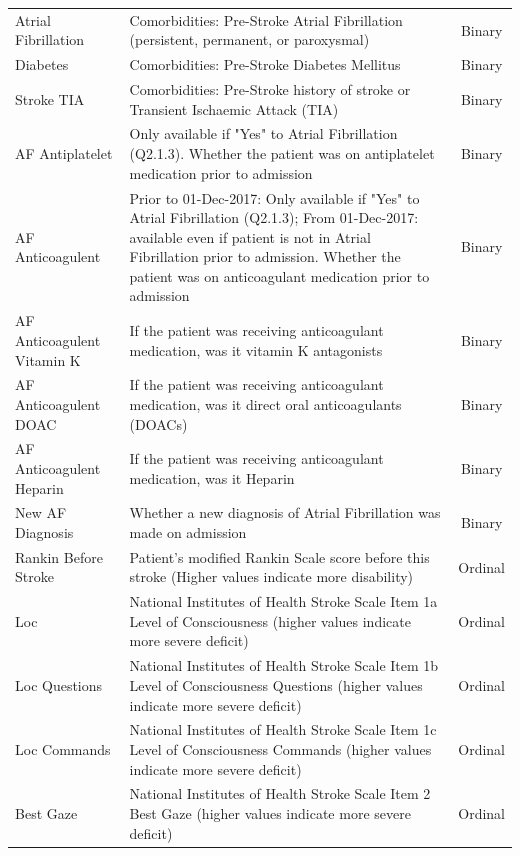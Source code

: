 \documentclass[12pt,a4paper, pdftex]{elsarticle}
\begin{document}
\begin{longtable}{|l|p{8.5cm}|c|}
        Atrial Fibrillation & Comorbidities: Pre-Stroke Atrial Fibrillation (persistent, permanent, or paroxysmal) & Binary \\
        Diabetes & Comorbidities: Pre-Stroke Diabetes Mellitus & Binary \\
        Stroke TIA & Comorbidities: Pre-Stroke history of stroke or Transient Ischaemic Attack (TIA) & Binary \\
        AF Antiplatelet & Only available if "Yes" to Atrial Fibrillation (Q2.1.3). Whether the patient was on antiplatelet medication prior to admission                              & Binary \\
        AF Anticoagulent & Prior to 01-Dec-2017: Only available if "Yes" to Atrial Fibrillation (Q2.1.3); From 01-Dec-2017: available even if patient is not in Atrial Fibrillation prior to admission. Whether the patient was on anticoagulant medication prior to admission & Binary \\
        AF Anticoagulent Vitamin K & If the patient was receiving anticoagulant medication, was it vitamin K antagonists & Binary \\
        AF Anticoagulent DOAC & If the patient was receiving anticoagulant medication, was it direct oral anticoagulants (DOACs) & Binary \\
        AF Anticoagulent Heparin & If the patient was receiving anticoagulant medication, was it Heparin & Binary \\
        New AF Diagnosis & Whether a new diagnosis of Atrial Fibrillation was made on admission & Binary \\
        Rankin Before Stroke & Patient's modified Rankin Scale score before this stroke (Higher values indicate more disability) & Ordinal \\
        Loc & National Institutes of Health Stroke Scale Item 1a Level of Consciousness (higher values indicate more severe deficit) & Ordinal \\
        Loc Questions & National Institutes of Health Stroke Scale Item 1b Level of Consciousness Questions (higher values indicate more severe deficit) & Ordinal \\
        Loc Commands & National Institutes of Health Stroke Scale Item 1c Level of Consciousness Commands (higher values indicate more severe deficit) & Ordinal \\
        Best Gaze & National Institutes of Health Stroke Scale Item 2 Best Gaze (higher values indicate more severe deficit) & Ordinal \\

\end{longtable}
\end{document}
